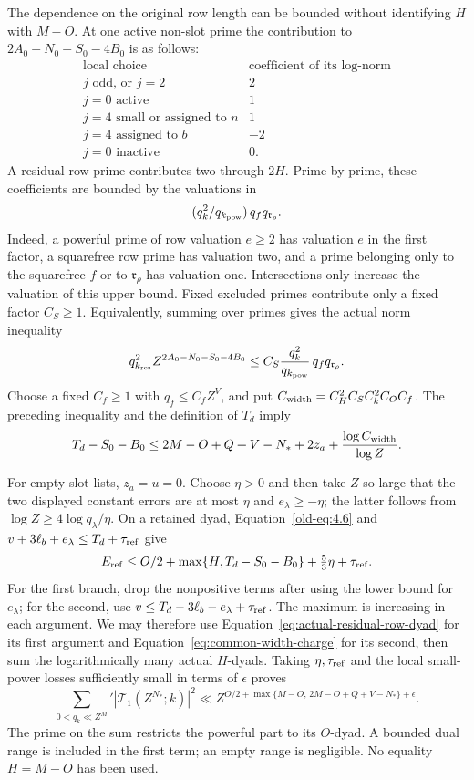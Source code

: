 \documentclass[11pt,a4paper]{article}
\numberwithin{equation}{section}
\numberwithin{figure}{section}
\theoremstyle{definition}
\theoremstyle{remark}
\begin{document}
The dependence on the original row length can be bounded without
identifying \(H\) with \(M-O\).  At one active non-slot prime the
contribution to
\(2A_0-N_0-S_0-4B_0\) is as follows:
\[
 \begin{array}{c|c}
 \text{local choice}&\text{coefficient of its log-norm}\\ \hline
 j\text{ odd, or }j=2&2\\
 j=0\text{ active}&1\\
 j=4\text{ small or assigned to }n&1\\
 j=4\text{ assigned to }b&-2\\
 j=0\text{ inactive}&0.
 \end{array}
\]
A residual row prime contributes two through \(2H\).  Prime by prime,
these coefficients are bounded by the valuations in
\[
 (q_k^2/q_{k_{\rm pow}})\,q_fq_{\mathfrak r_\rho}.
\]
Indeed, a powerful prime of row valuation \(e\ge2\) has valuation
\(e\) in the first factor, a squarefree row prime has valuation two,
and a prime belonging only to the squarefree \(f\) or to
\(\mathfrak r_\rho\) has valuation one.  Intersections only increase
the valuation of this upper bound.  Fixed excluded primes contribute
only a fixed factor \(C_S\ge1\).  Equivalently, summing over primes gives
the actual norm inequality
\[
 q_{k_{\rm res}}^2 Z^{2A_0-N_0-S_0-4B_0}
 \le C_S\frac{q_k^2}{q_{k_{\rm pow}}}\,q_fq_{\mathfrak r_\rho}.
\]
Choose a fixed \(C_f\ge1\) with \(q_f\le C_fZ^V\), and put
\(C_{\rm width}=C_H^2C_SC_k^2C_OC_f\).  The preceding inequality and
the definition of \(T_d\) imply
\begin{equation}\label{eq:common-width-charge}
 T_d-S_0-B_0
 \le 2M-O+Q+V-N_*+2z_a+
       \frac{\log C_{\rm width}}{\log Z}.
\end{equation}

For empty slot lists, \(z_a=u=0\).  Choose \(\eta>0\) and then take \(Z\)
so large that the two displayed constant errors are at most \(\eta\) and
\(e_\lambda\ge-\eta\); the latter follows from
\(\log Z\ge4\log q_\lambda/\eta\).  On a retained dyad,
Equation~\eqref{old-eq:4.6} and
\(v+3\ell_b+e_\lambda\le T_d+\tau_{\rm ref}\) give
\[
 E_{\rm ref}
 \le O/2+\max\{H,T_d-S_0-B_0\}+\tfrac53\eta+\tau_{\rm ref}.
\]
For the first branch, drop the nonpositive terms after using the lower
bound for \(e_\lambda\); for the second, use
\(v\le T_d-3\ell_b-e_\lambda+\tau_{\rm ref}\).
The maximum is increasing in each argument.  We may therefore use
Equation~\eqref{eq:actual-residual-row-dyad} for its first argument and
Equation~\eqref{eq:common-width-charge} for its second, then sum the
logarithmically many actual \(H\)-dyads.  Taking \(\eta,\tau_{\rm ref}\)
and the local small-power losses sufficiently small in terms of
\(\epsilon\) proves
\begin{equation}\label{eq:completed-moment}
 \sum_{0<q_k\ll Z^M}'|\mathcal T_1(Z^{N_*};k)|^2
 \ll Z^{O/2+\max\{M-O,\,2M-O+Q+V-N_*\}+\epsilon}.
\end{equation}
The prime on the sum restricts the powerful part to its \(O\)-dyad.
A bounded dual range is included in the first term; an empty range is
negligible.  No equality \(H=M-O\) has been used.
\end{document}
